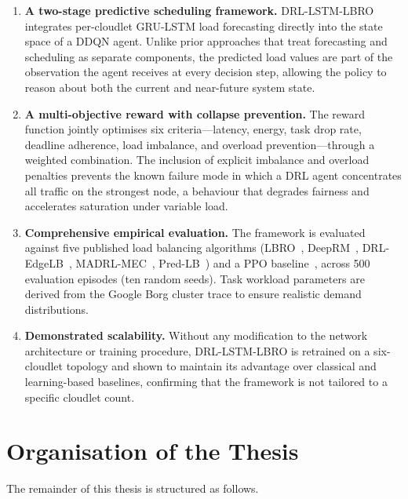 \begin{enumerate}

  \item \textbf{A two-stage predictive scheduling framework.}
  DRL-LSTM-LBRO integrates per-cloudlet GRU-LSTM load forecasting
  directly into the state space of a DDQN agent. Unlike prior
  approaches that treat forecasting and scheduling as separate
  components, the predicted load values are part of the observation
  the agent receives at every decision step, allowing the policy to
  reason about both the current and near-future system state.

  \item \textbf{A multi-objective reward with collapse prevention.}
  The reward function jointly optimises six criteria---latency,
  energy, task drop rate, deadline adherence, load imbalance, and
  overload prevention---through a weighted combination. The inclusion
  of explicit imbalance and overload penalties prevents the known
  failure mode in which a DRL agent concentrates all traffic on the
  strongest node, a behaviour that degrades fairness and accelerates
  saturation under variable load.

  \item \textbf{Comprehensive empirical evaluation.}
  The framework is evaluated against five published load balancing
  algorithms (LBRO~\cite{nayyer2022lbro},
  DeepRM~\cite{mao2016resource}, DRL-EdgeLB~\cite{liu2022edgelb},
  MADRL-MEC~\cite{zhao2022madrl}, Pred-LB~\cite{predlb2025}) and a
  PPO baseline~\cite{schulman2017ppo}, across 500 evaluation episodes
  (ten random seeds). Task workload parameters are derived from the
  Google Borg cluster trace to ensure realistic demand distributions.

  \item \textbf{Demonstrated scalability.}
  Without any modification to the network architecture or training
  procedure, DRL-LSTM-LBRO is retrained on a six-cloudlet topology
  and shown to maintain its advantage over classical and learning-based
  baselines, confirming that the framework is not tailored to a
  specific cloudlet count.

\end{enumerate}

\section{Organisation of the Thesis}
\label{sec:organisation}

The remainder of this thesis is structured as follows.

